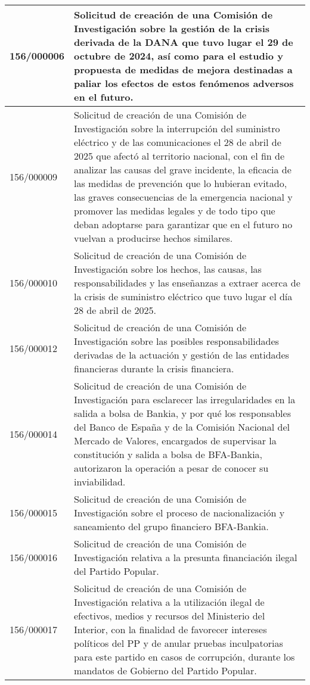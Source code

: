 {\begin{table}[H]
\begin{center}
\begin{tabularx}{\linewidth}{| l | X |}
\hline
156/000006 & Solicitud de creación de una Comisión de Investigación sobre la gestión de la crisis derivada de la DANA que tuvo lugar el 29 de octubre de 2024, así como para el estudio y propuesta de medidas de mejora destinadas a paliar los efectos de estos fenómenos adversos en el futuro. \\
\hline
156/000009 & Solicitud de creación de una Comisión de Investigación sobre la interrupción del suministro eléctrico y de las comunicaciones el 28 de abril de 2025 que afectó al territorio nacional, con el fin de analizar las causas del grave incidente, la eficacia de las medidas de prevención que lo hubieran evitado, las graves consecuencias de la emergencia nacional y promover las medidas legales y de todo tipo que deban adoptarse para garantizar que en el futuro no vuelvan a producirse hechos similares. \\
\hline
156/000010 & Solicitud de creación de una Comisión de Investigación sobre los hechos, las causas, las responsabilidades y las enseñanzas a extraer acerca de la crisis de suministro eléctrico que tuvo lugar el día 28 de abril de 2025. \\
\hline
156/000012 & Solicitud de creación de una Comisión de Investigación sobre las posibles responsabilidades derivadas de la actuación y gestión de las entidades financieras durante la crisis financiera. \\
\hline
156/000014 & Solicitud de creación de una Comisión de Investigación para esclarecer las irregularidades en la salida a bolsa de Bankia, y por qué los responsables del Banco de España y de la Comisión Nacional del Mercado de Valores, encargados de supervisar la constitución y salida a bolsa de BFA-Bankia, autorizaron la operación a pesar de conocer su inviabilidad. \\
\hline
156/000015 & Solicitud de creación de una Comisión de Investigación sobre el proceso de nacionalización y saneamiento del grupo financiero BFA-Bankia. \\
\hline
156/000016 & Solicitud de creación de una Comisión de Investigación relativa a la presunta financiación ilegal del Partido Popular. \\
\hline
156/000017 & Solicitud de creación de una Comisión de Investigación relativa a la utilización ilegal de efectivos, medios y recursos del Ministerio del Interior, con la finalidad de favorecer intereses políticos del PP y de anular pruebas inculpatorias para este partido en casos de corrupción, durante los mandatos de Gobierno del Partido Popular. \\

\end{tabularx}
\end{center}
\end{table}}
